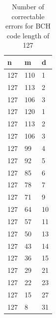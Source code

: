 \begin{table}
\begin{tabular}{lll}
\hline
n   &   m &   d \\ \hline
127 & 110 &   1 \\
127 & 113 &   2 \\
127 & 106 &   3 \\
127 & 120 &   1 \\
127 & 113 &   2 \\
127 & 106 &   3 \\
127 &  99 &   4 \\
127 &  92 &   5 \\
127 &  85 &   6 \\
127 &  78 &   7 \\
127 &  71 &   9 \\
127 &  64 &  10 \\
127 &  57 &  11 \\
127 &  50 &  13 \\
127 &  43 &  14 \\
127 &  36 &  15 \\
127 &  29 &  21 \\
127 &  22 &  23 \\
127 &  15 &  27 \\
127 &   8 &  31
\end{tabular}
\caption{Number of correctable errors for BCH code length of 127}
\label{tab:bch127}
\end{table}
